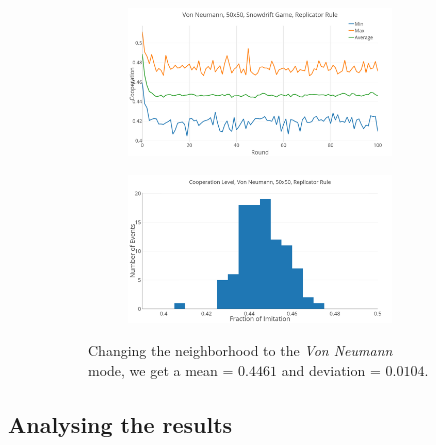 \documentclass[a4paper, 11pt]{article}
\begin{document}
\begin{figure}[H]
\begin{subfigure}{.55\textwidth}
	\begin{subfigure}{1\textwidth}
		\includegraphics[width=1\linewidth]{SDVonNeumann50x50}
	\end{subfigure}

	\begin{subfigure}{1\textwidth}
		\includegraphics[width=1\linewidth]{SDVonNeumann50x50HG}
	\end{subfigure}
\end{subfigure}%
\begin{subfigure}{.45\textwidth}
	Changing the neighborhood to the \textit{Von Neumann} mode, we get a mean = $0.4461$ and deviation = $0.0104$.
\end{subfigure}

\end{figure}



\newpage
\subsection{Analysing the results}
\end{document}
